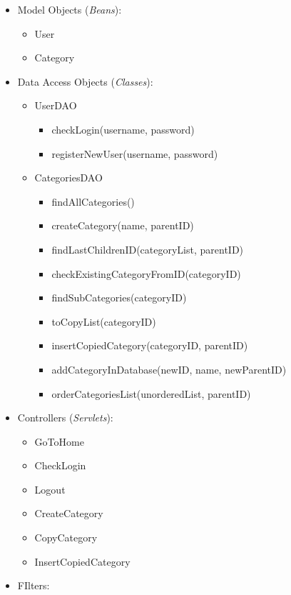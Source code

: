 \begin{itemize}
\tightlist
\item
  Model Objects (\emph{Beans}):

  \begin{itemize}
  \tightlist
  \item
    User
  \item
    Category
  \end{itemize}
\item
  Data Access Objects (\emph{Classes}):

  \begin{itemize}
  \tightlist
  \item
    UserDAO

    \begin{itemize}
    \tightlist
    \item
      checkLogin(username, password)
    \item
      registerNewUser(username, password)
    \end{itemize}
  \item
    CategoriesDAO

    \begin{itemize}
    \tightlist
    \item
      findAllCategories()
    \item
      createCategory(name, parentID)
    \item
      findLastChildrenID(categoryList, parentID)
    \item
      checkExistingCategoryFromID(categoryID)
    \item
      findSubCategories(categoryID)
    \item
      toCopyList(categoryID)
    \item
      insertCopiedCategory(categoryID, parentID)
    \item
      addCategoryInDatabase(newID, name, newParentID)
    \item
      orderCategoriesList(unorderedList, parentID)
    \end{itemize}
  \end{itemize}
\item
  Controllers (\emph{Servlets}):

  \begin{itemize}
  \tightlist
  \item
    GoToHome
  \item
    CheckLogin
  \item
    Logout
  \item
    CreateCategory
  \item
    CopyCategory
  \item
    InsertCopiedCategory
  \end{itemize}
\item
  FIlters:


\end{itemize}
